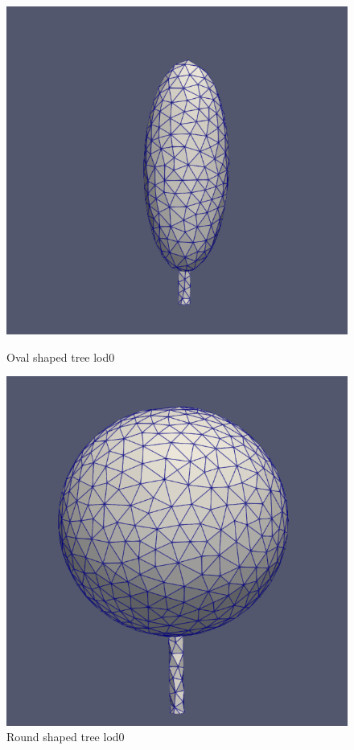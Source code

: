 \documentclass[12pt]{article}
\begin{document}
\begin{figure}[H]
    \centering
    \begin{minipage}{0.45\textwidth}
        \centering
        \includegraphics[width=1\textwidth]{images/tree-oval_lod0.png}
        \caption{Oval shaped tree lod0}
    \end{minipage}
    \begin{minipage}{0.45\textwidth}
        \centering
        \includegraphics[width=1\textwidth]{images/tree-round_lod0.png}
        \caption{Round shaped tree lod0}
    \end{minipage}
\end{figure}
\end{document}
